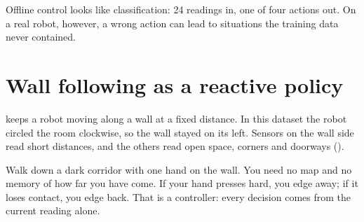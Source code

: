 \begin{intuition}
Offline control looks like classification: 24 readings in, one of four actions out. On a real robot, however, a wrong action can lead to situations the training data never contained.
\end{intuition}

\section{Wall following as a reactive policy}

 keeps a robot moving along a wall at a fixed distance. In this dataset the robot circled the room clockwise, so the wall stayed on its left. Sensors on the wall side read short distances, and the others read open space, corners and doorways ().

\begin{analogy}
Walk down a dark corridor with one hand on the wall. You need no map and no memory of how far you have come. If your hand presses hard, you edge away; if it loses contact, you edge back. That is a  controller: every decision comes from the current reading alone.
\end{analogy}

